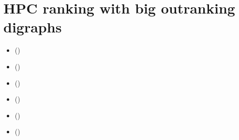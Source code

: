 \documentclass[a4paper,10pt,english]{sphinxhowto}
\begin{document}
\section{HPC ranking with big outranking digraphs}
\label{\detokenize{tutorial:hpc-ranking-with-big-outranking-digraphs}}\label{\detokenize{tutorial:hpc-tutorial-label}}
\begin{sphinxShadowBox}
\begin{itemize}
\item {} 
\label{\detokenize{tutorial:id204}}{\hyperref[\detokenize{tutorial:c-compiled-python-modules}]{}} ()

\item {} 
\label{\detokenize{tutorial:id205}}{\hyperref[\detokenize{tutorial:big-data-performance-tableaux}]{}} ()

\item {} 
\label{\detokenize{tutorial:id206}}{\hyperref[\detokenize{tutorial:c-implemented-integer-valued-outranking-digraphs}]{}} ()

\item {} 
\label{\detokenize{tutorial:id207}}{\hyperref[\detokenize{tutorial:the-sparse-outranking-digraph-implementation}]{}} ()

\item {} 
\label{\detokenize{tutorial:id208}}{\hyperref[\detokenize{tutorial:ranking-big-sets-of-decision-alternatives}]{}} ()

\item {} 
\label{\detokenize{tutorial:id209}}{\hyperref[\detokenize{tutorial:hpc-quantiles-ranking-records}]{}} ()

\end{itemize}
\end{sphinxShadowBox}
\end{document}
